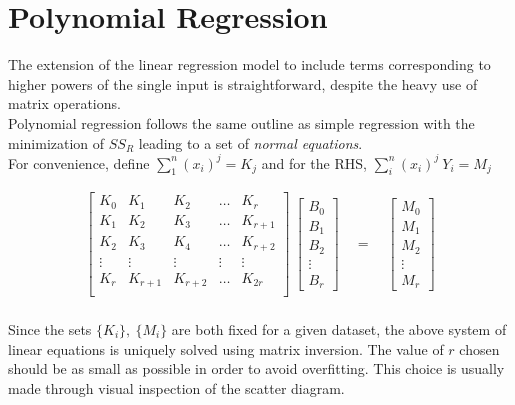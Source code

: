 \section{Polynomial Regression}

The extension of the linear regression model to include terms corresponding to higher powers of the single input is straightforward, despite the heavy use of matrix operations.\\

Polynomial regression follows the same outline as simple regression with the minimization of $ SS_R $ leading to a set of \textit{normal equations}.\\

For convenience, define $ \sum_1^n (x_i)^{j} = K_j$ and for the RHS, $ \sum_i^n (x_i)^j\ Y_i = M_j $
 
\begin{align}
	\begin{bmatrix}
		K_0 & K_1 & K_2 & \dots & K_r\\
		K_1 & K_2 & K_3 & \dots & K_{r+1}\\
		K_2 & K_3 & K_4 & \dots & K_{r+2}\\
		\vdots & \vdots & \vdots & \vdots & \vdots \\
		K_r & K_{r+1} & K_{r+2} & \dots & K_{2r}\\
	\end{bmatrix} 
	\ 
	\begin{bmatrix}
		B_0 \\
		B_1 \\
		B_2 \\
		\vdots \\
		B_r
	\end{bmatrix}
	\quad = \quad  
	\begin{bmatrix}
		M_0 \\
		M_1 \\
		M_2 \\
		\vdots \\
		M_r
	\end{bmatrix}
\end{align}\\

Since the sets $ \{K_i\},\ \{M_i\} $ are both fixed for a given dataset, the above system of linear equations is uniquely solved using matrix inversion. The value of $ r $ chosen should be as small as possible in order to avoid overfitting. This choice is usually made through visual inspection of the scatter diagram.\\

